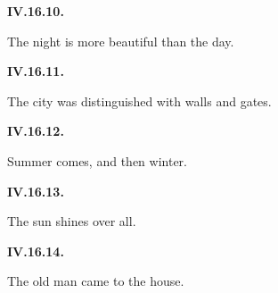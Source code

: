 \par\begin{minipage}{\linewidth}\raggedright
\textbf{IV.16.10.}

The night is more beautiful than the day.

\end{minipage}\par\addvspace{4pt}

\par\begin{minipage}{\linewidth}\raggedright
\textbf{IV.16.11.}

The city was distinguished with walls and gates.

\end{minipage}\par\addvspace{4pt}

\par\begin{minipage}{\linewidth}\raggedright
\textbf{IV.16.12.}

Summer comes, and then winter.

\end{minipage}\par\addvspace{4pt}

\par\begin{minipage}{\linewidth}\raggedright
\textbf{IV.16.13.}

The sun shines over all.

\end{minipage}\par\addvspace{4pt}

\par\begin{minipage}{\linewidth}\raggedright
\textbf{IV.16.14.}

The old man came to the house.

\end{minipage}\par\addvspace{4pt}

